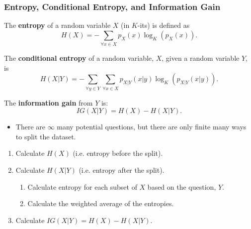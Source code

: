 \subsubsection{Entropy, Conditional Entropy, and Information Gain}
\begin{definition}
    The \textbf{entropy} of a random variable \(X\) (in \(K\)-its) is defined as
    \begin{equation*}
        H(X) = -\sum_{\forall x \in X} p_X(x) \log_K(p_X(x)).
    \end{equation*}

    The \textbf{conditional entropy} of a random variable, \(X\), given a random variable \(Y\), is
    \begin{equation*}
        H(X|Y) = -\sum_{\forall y \in Y} \sum_{\forall x \in X} p_{X|Y}(x | y) \log_K(p_{X|Y}(x|y)).
    \end{equation*}

    The \textbf{information gain} from \(Y\) is:
    \begin{equation*}
        IG(X|Y) = H(X) - H(X|Y).
    \end{equation*}
\end{definition}

\begin{warning}
    \begin{itemize}
        \item There are $\infty$ many potential questions, but there are only finite many ways to split the dataset. 
    \end{itemize}
\end{warning}
\newpage

\begin{process}
    \begin{enumerate}
        \item Calculate \(H(X)\) (i.e. entropy before the split).
        \item Calculate \(H(X|Y)\) (i.e. entropy after the split).
        \begin{enumerate}
            \item Calculate entropy for each subset of \(X\) based on the question, \(Y\).
            \item Calculate the weighted average of the entropies.
        \end{enumerate}
        \item Calculate \(IG(X|Y) = H(X) - H(X|Y)\).
    \end{enumerate}
\end{process}

